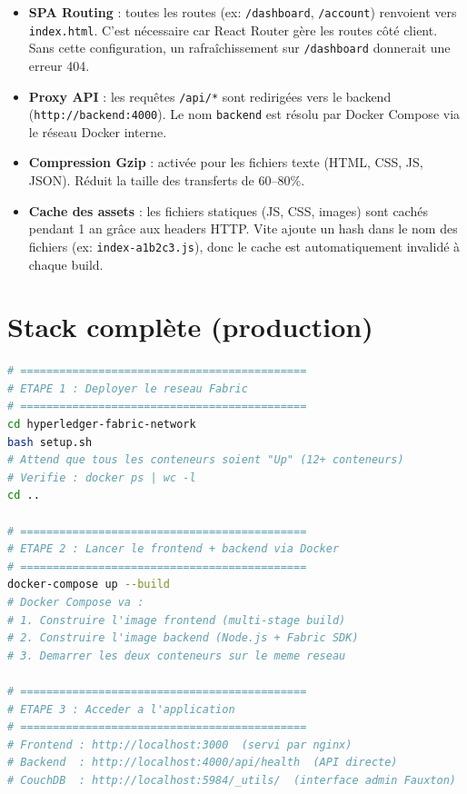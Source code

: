 \documentclass[12pt,a4paper,twoside]{report}
\begin{document}
\begin{itemize}
    \item \textbf{SPA Routing} : toutes les routes (ex: \texttt{/dashboard}, \texttt{/account}) renvoient vers \texttt{index.html}. C'est nécessaire car React Router gère les routes côté client. Sans cette configuration, un rafraîchissement sur \texttt{/dashboard} donnerait une erreur 404.
    
    \item \textbf{Proxy API} : les requêtes \texttt{/api/*} sont redirigées vers le backend (\texttt{http://backend:4000}). Le nom \texttt{backend} est résolu par Docker Compose via le réseau Docker interne.
    
    \item \textbf{Compression Gzip} : activée pour les fichiers texte (HTML, CSS, JS, JSON). Réduit la taille des transferts de 60--80\%.
    
    \item \textbf{Cache des assets} : les fichiers statiques (JS, CSS, images) sont cachés pendant 1 an grâce aux headers HTTP. Vite ajoute un hash dans le nom des fichiers (ex: \texttt{index-a1b2c3.js}), donc le cache est automatiquement invalidé à chaque build.
\end{itemize}

\section{Stack complète (production)}

\begin{lstlisting}[language=bash, caption=Déploiement complet étape par étape]
# ============================================
# ETAPE 1 : Deployer le reseau Fabric
# ============================================
cd hyperledger-fabric-network
bash setup.sh
# Attend que tous les conteneurs soient "Up" (12+ conteneurs)
# Verifie : docker ps | wc -l
cd ..

# ============================================
# ETAPE 2 : Lancer le frontend + backend via Docker
# ============================================
docker-compose up --build
# Docker Compose va :
# 1. Construire l'image frontend (multi-stage build)
# 2. Construire l'image backend (Node.js + Fabric SDK)
# 3. Demarrer les deux conteneurs sur le meme reseau

# ============================================
# ETAPE 3 : Acceder a l'application
# ============================================
# Frontend : http://localhost:3000  (servi par nginx)
# Backend  : http://localhost:4000/api/health  (API directe)
# CouchDB  : http://localhost:5984/_utils/  (interface admin Fauxton)
\end{lstlisting}
\end{document}
